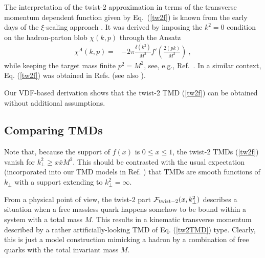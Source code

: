 \documentclass[final,5p,times,twocolumn]{elsarticle}
\begin{document}
  

The interpretation of  the twist-2 approximation  in terms of the 
  transverse momentum dependent function given by \mbox{Eq. (\ref{tw2f})} 
is known    \cite{Barbieri:1976rd,Ellis:1982cd} 
 from the early days of the $\xi$-scaling approach
\cite{Georgi:1976ve}.  
 It  was derived 
  by  imposing the  $k^2=0$ condition on the 
  hadron-parton blob $\chi (k,p)$   through the Ansatz 
  \begin{align}
\chi^A  (k,p)  =& -2 \pi 
\frac{\delta (k^2) }{M^2} f' \left ( \frac{2(pk)}{M^2}\right )   \   ,
\label{xiAn}
\end{align}
while    keeping  the  target mass finite $p^2=M^2$, 
  see, e.g.,  \mbox{Ref. \cite{Barbieri:1976rd}.}   
  In a similar context, Eq. (\ref{tw2f})  was obtained in Refs.
\cite{Efremov:2009ze,Efremov:2010mt} (see also \cite{Efremov:2015cdb}).
  
  Our VDF-based derivation 
  shows that the twist-2 TMD (\ref{tw2f})   can be obtained without  
  additional assumptions.   
  
  \subsection{Comparing TMDs} 
  
 Note that, because the support of $f(x)$ is $0\leq x \leq 1$,
 the \mbox{twist-2}   TMDs  (\ref{tw2f}) vanish  for $k_\perp^2\geq x \bar x  M^2$. 
 This should be contrasted with the usual expectation
 (incorporated  into  our TMD models in Ref. \cite{Radyushkin:2016hsy} ) 
 that TMDs  are smooth functions of $k_\perp$ with a support extending to $k_\perp^2= \infty$.     


 




From a physical point of view, the twist-2 part   ${\cal F} _{\rm twist-2}(x, k_\perp^2) $  
describes a  situation when a free massless quark 
happens somehow to be bound within    a system with a total mass $M$. 
This  results 
in 
 a  kinematic transverse momentum
 described by a rather artificially-looking TMD of Eq.  (\ref{tw2TMD}) type. 
 Clearly, this is just a  model construction mimicking 
 a hadron by a combination of free quarks 
 with   the total  invariant mass $M$. 
 
\end{document}
